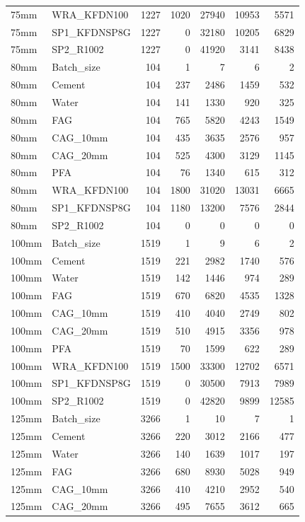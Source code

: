 \documentclass[
]{article}
\begin{document}
\begin{longtable}[]{@{}llrrrrr@{}}
75mm & WRA\_KFDN100 & 1227 & 1020 & 27940 & 10953 & 5571 \\
75mm & SP1\_KFDNSP8G & 1227 & 0 & 32180 & 10205 & 6829 \\
75mm & SP2\_R1002 & 1227 & 0 & 41920 & 3141 & 8438 \\
80mm & Batch\_size & 104 & 1 & 7 & 6 & 2 \\
80mm & Cement & 104 & 237 & 2486 & 1459 & 532 \\
80mm & Water & 104 & 141 & 1330 & 920 & 325 \\
80mm & FAG & 104 & 765 & 5820 & 4243 & 1549 \\
80mm & CAG\_10mm & 104 & 435 & 3635 & 2576 & 957 \\
80mm & CAG\_20mm & 104 & 525 & 4300 & 3129 & 1145 \\
80mm & PFA & 104 & 76 & 1340 & 615 & 312 \\
80mm & WRA\_KFDN100 & 104 & 1800 & 31020 & 13031 & 6665 \\
80mm & SP1\_KFDNSP8G & 104 & 1180 & 13200 & 7576 & 2844 \\
80mm & SP2\_R1002 & 104 & 0 & 0 & 0 & 0 \\
100mm & Batch\_size & 1519 & 1 & 9 & 6 & 2 \\
100mm & Cement & 1519 & 221 & 2982 & 1740 & 576 \\
100mm & Water & 1519 & 142 & 1446 & 974 & 289 \\
100mm & FAG & 1519 & 670 & 6820 & 4535 & 1328 \\
100mm & CAG\_10mm & 1519 & 410 & 4040 & 2749 & 802 \\
100mm & CAG\_20mm & 1519 & 510 & 4915 & 3356 & 978 \\
100mm & PFA & 1519 & 70 & 1599 & 622 & 289 \\
100mm & WRA\_KFDN100 & 1519 & 1500 & 33300 & 12702 & 6571 \\
100mm & SP1\_KFDNSP8G & 1519 & 0 & 30500 & 7913 & 7989 \\
100mm & SP2\_R1002 & 1519 & 0 & 42820 & 9899 & 12585 \\
125mm & Batch\_size & 3266 & 1 & 10 & 7 & 1 \\
125mm & Cement & 3266 & 220 & 3012 & 2166 & 477 \\
125mm & Water & 3266 & 140 & 1639 & 1017 & 197 \\
125mm & FAG & 3266 & 680 & 8930 & 5028 & 949 \\
125mm & CAG\_10mm & 3266 & 410 & 4210 & 2952 & 540 \\
125mm & CAG\_20mm & 3266 & 495 & 7655 & 3612 & 665 \\

\end{longtable}
\end{document}
